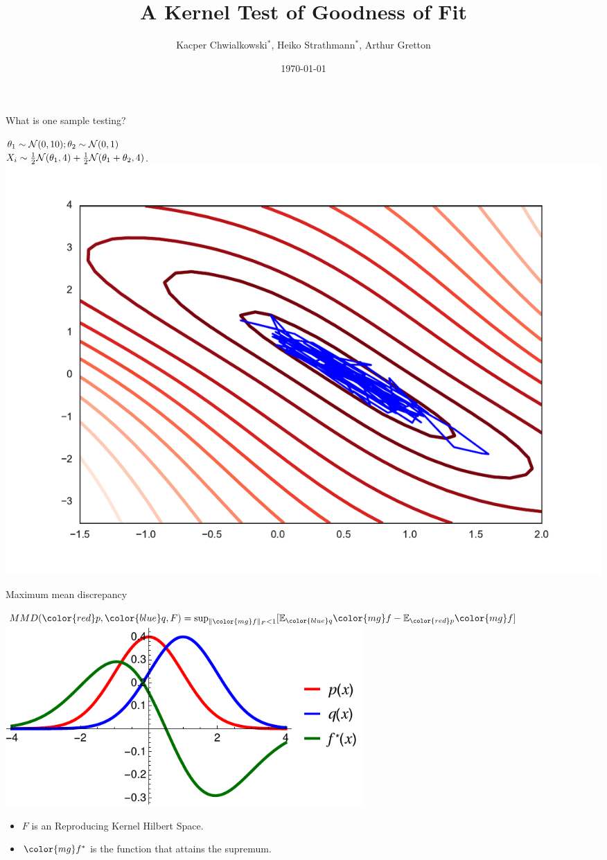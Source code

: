 \documentclass{beamer}
\title{ A Kernel Test of Goodness of Fit}
\date{\today}
\author{Kacper Chwialkowski$^*$, Heiko Strathmann$^*$, Arthur Gretton}
\institute{}
\begin{document}
\frame{\titlepage}
 \begin{frame}{What is one sample testing?}
 \begin{center}
$\theta_{1}\sim{\cal N}(0,10);\theta_{2}\sim{\cal N}(0,1)$\\
$ X_{i}\sim\frac{1}{2}{\cal N}(\theta_{1},4)+\frac{1}{2}{\cal N}(\theta_{1}+\theta_{2},4) $.
 \includegraphics[width=.9\textwidth]{./img/sgld_trace_and_density.pdf} 
 \end{center}
 \end{frame}
 
 \begin{frame}{Maximum mean discrepancy}
 \begin{center}
$MMD({\color{red} p},{ \color{blue} q},F) = \sup_{   \| {\color{mg}f} \|_F<1} [\ev_{{ \color{blue} q}}{\color{mg}f}- \ev_{{\color{red} p}}{\color{mg} f}]  $\\
\vspace{0.5cm}
 \includegraphics[width=0.6\textwidth]{./img/mmd.pdf} 
 \end{center}
 \begin{itemize}
  \item $F$ is an Reproducing Kernel Hilbert Space.
  \item ${\color{mg} f^*}$ is the function that attains the supremum.
 \end{itemize}

 \end{frame} 
 
\end{document}
